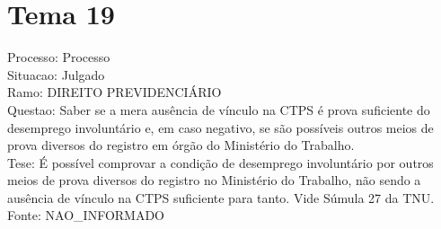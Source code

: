 \documentclass[12pt]{article}
\begin{document}
\section*{Tema 19}
Processo: Processo\\
Situacao: Julgado\\
Ramo: DIREITO PREVIDENCIÁRIO\\
Questao: Saber se a mera ausência de vínculo na CTPS é prova suficiente do desemprego involuntário e, em caso negativo, se são possíveis outros meios de prova diversos do registro em órgão do Ministério do Trabalho.\\
Tese: É possível comprovar a condição de desemprego involuntário por outros meios de prova diversos do registro no Ministério do Trabalho, não sendo a ausência de vínculo na CTPS suficiente para tanto. Vide Súmula 27 da TNU.\\
Fonte: NAO\_INFORMADO
\end{document}
